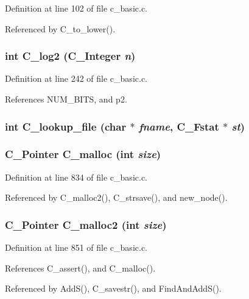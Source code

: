 Definition at line 102 of file c\_\-basic.c.

Referenced by C\_\-to\_\-lower().
\subsubsection{\setlength{\rightskip}{0pt plus 5cm}int C\_\-log2 (\bf{C\_\-Integer} {\em n})}\label{c__basic_8h_b0494661b08b6670839d5b02d4d7cee9}




Definition at line 242 of file c\_\-basic.c.

References NUM\_\-BITS, and p2.
\subsubsection{\setlength{\rightskip}{0pt plus 5cm}int C\_\-lookup\_\-file (char $\ast$ {\em fname}, \bf{C\_\-Fstat} $\ast$ {\em st})}\label{c__basic_8h_b71ed209c92ed0eb902b38e1f52b2020}


\subsubsection{\setlength{\rightskip}{0pt plus 5cm}\bf{C\_\-Pointer} C\_\-malloc (int {\em size})}\label{c__basic_8h_8d95f5c50cd92a949156472463d1e7f6}




Definition at line 834 of file c\_\-basic.c.

Referenced by C\_\-malloc2(), C\_\-strsave(), and new\_\-node().
\subsubsection{\setlength{\rightskip}{0pt plus 5cm}\bf{C\_\-Pointer} C\_\-malloc2 (int {\em size})}\label{c__basic_8h_4e6901a0bdbd2271b25bee7ca33f5e0b}




Definition at line 851 of file c\_\-basic.c.

References C\_\-assert(), and C\_\-malloc().

Referenced by Add\-S(), C\_\-savestr(), and Find\-And\-Add\-S().
